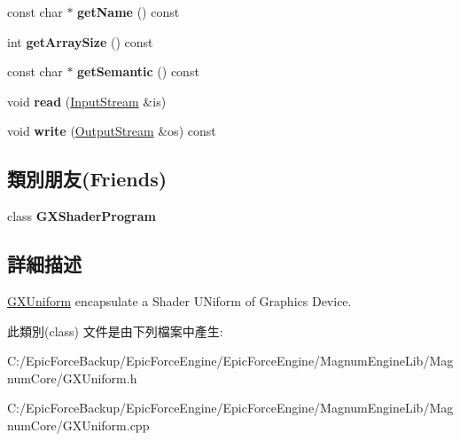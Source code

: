 \begin{DoxyCompactItemize}
\item 
const char $\ast$ {\bfseries get\+Name} () const \hypertarget{class_magnum_1_1_g_x_uniform_aa9191ea4a2e3942f0167f1d415804352}{}\label{class_magnum_1_1_g_x_uniform_aa9191ea4a2e3942f0167f1d415804352}

\item 
int {\bfseries get\+Array\+Size} () const \hypertarget{class_magnum_1_1_g_x_uniform_a710c2a0c3976b393fd2889874d7fba6a}{}\label{class_magnum_1_1_g_x_uniform_a710c2a0c3976b393fd2889874d7fba6a}

\item 
const char $\ast$ {\bfseries get\+Semantic} () const \hypertarget{class_magnum_1_1_g_x_uniform_afb33ee50a874ec6d6dbe5bc022b28349}{}\label{class_magnum_1_1_g_x_uniform_afb33ee50a874ec6d6dbe5bc022b28349}

\item 
void {\bfseries read} (\hyperlink{class_magnum_1_1_input_stream}{Input\+Stream} \&is)\hypertarget{class_magnum_1_1_g_x_uniform_af9feed7e9cf196e98b432cfc3419208d}{}\label{class_magnum_1_1_g_x_uniform_af9feed7e9cf196e98b432cfc3419208d}

\item 
void {\bfseries write} (\hyperlink{class_magnum_1_1_output_stream}{Output\+Stream} \&os) const \hypertarget{class_magnum_1_1_g_x_uniform_a962751706993617a55fd2c9cc08caa09}{}\label{class_magnum_1_1_g_x_uniform_a962751706993617a55fd2c9cc08caa09}

\end{DoxyCompactItemize}
\subsection*{類別朋友(Friends)}
\begin{DoxyCompactItemize}
\item 
class {\bfseries G\+X\+Shader\+Program}\hypertarget{class_magnum_1_1_g_x_uniform_a4a6e107978c21d22d7e96be0f48962d2}{}\label{class_magnum_1_1_g_x_uniform_a4a6e107978c21d22d7e96be0f48962d2}

\end{DoxyCompactItemize}


\subsection{詳細描述}
\hyperlink{class_magnum_1_1_g_x_uniform}{G\+X\+Uniform} encapsulate a Shader U\+Niform of Graphics Device. 

此類別(class) 文件是由下列檔案中產生\+:\begin{DoxyCompactItemize}
\item 
C\+:/\+Epic\+Force\+Backup/\+Epic\+Force\+Engine/\+Epic\+Force\+Engine/\+Magnum\+Engine\+Lib/\+Magnum\+Core/G\+X\+Uniform.\+h\item 
C\+:/\+Epic\+Force\+Backup/\+Epic\+Force\+Engine/\+Epic\+Force\+Engine/\+Magnum\+Engine\+Lib/\+Magnum\+Core/G\+X\+Uniform.\+cpp\end{DoxyCompactItemize}
